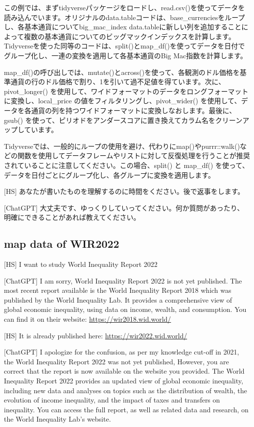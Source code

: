 \documentclass[
]{bxjsbook}
\theoremstyle{definition}
\theoremstyle{definition}
\theoremstyle{definition}
\theoremstyle{definition}
\theoremstyle{remark}
\begin{document}
この例では、まずtidyverseパッケージをロードし、read.csv()を使ってデータを読み込んでいます。オリジナルのdata.tableコードは、base\_currenciesをループし、各基本通貨についてbig\_mac\_index data.tableに新しい列を追加することによって複数の基本通貨についてのビッグマックインデックスを計算します。Tidyverseを使った同等のコードは、split()とmap\_df()を使ってデータを日付でグループ化し、一連の変換を適用して各基本通貨のBig Mac指数を計算します。

map\_df()の呼び出しでは、mutate()とacross()を使って、各観測のドル価格を基準通貨の行のドル価格で割り、1を引いて過不足値を得ています。次に、pivot\_longer() を使用して、ワイドフォーマットのデータをロングフォーマットに変換し、local\_price の値をフィルタリングし、pivot\_wider() を使用して、データを各通貨の列を持つワイドフォーマットに変換しなおします。最後に、gsub() を使って、ピリオドをアンダースコアに置き換えてカラム名をクリーンアップしています。

Tidyverseでは、一般的にループの使用を避け、代わりにmap()やpurrr::walk()などの関数を使用してデータフレームやリストに対して反復処理を行うことが推奨されていることに注意してください。この場合、split() と map\_df() を使って、データを日付ごとにグループ化し、各グループに変換を適用します。

{[}HS{]} あなたが書いたものを理解するのに時間をください。後で返事をします。

{[}ChatGPT{]} 大丈夫です、ゆっくりしていってください。何か質問があったり、明確にできることがあれば教えてください。

\hypertarget{mapdataofwir2022}{%
\subsection{map data of WIR2022}\label{mapdataofwir2022}}

{[}HS{]} I want to study World Inequality Report 2022

{[}ChatGPT{]} I am sorry, World Inequality Report 2022 is not yet published. The most recent report available is the World Inequality Report 2018 which was published by the World Inequality Lab. It provides a comprehensive view of global economic inequality, using data on income, wealth, and consumption. You can find it on their website: \url{https://wir2018.wid.world/}

{[}HS{]} It is already published here: \url{https://wir2022.wid.world/}

{[}ChatGPT{]} I apologize for the confusion, as per my knowledge cut-off in 2021, the World Inequality Report 2022 was not yet published, However, you are correct that the report is now available on the website you provided. The World Inequality Report 2022 provides an updated view of global economic inequality, including new data and analyses on topics such as the distribution of wealth, the evolution of income inequality, and the impact of taxes and transfers on inequality. You can access the full report, as well as related data and research, on the World Inequality Lab's website.
\end{document}

